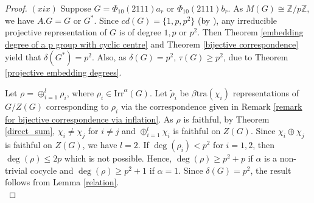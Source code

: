 \documentclass[a4paper,11pt]{amsart}
\numberwithin{equation}{section}
\numberwithin{equation}{subsection}
\newcommand{\Z}{\mathbb{Z}}
\newcommand{\tg}{\tau(G)}
\newcommand{\ti}{\tau_{irr}(G)}
\newcommand{\poonam}[1]{{\color{blue} #1}}
\begin{document}
\begin{proof}
$(xix)$ Suppose $G = \Phi_{10}(2111)a_r$ or $\Phi_{10}(2111)b_r$. %
As $M(G) \cong \Z/p\Z$, we have $A.G =G$ or $G^*$. Since $cd(G)=\{1,p,p^2\}$ (by \cite[Lemma 5.8]{Prajapati}), any irreducible projective representation of $G$ is of degree $1, p$ or $p^2$. Then Theorem \ref{embedding degree of a p group with cyclic centre} and Theorem \ref{bijective correspondence} yield that $\delta(G^*)= p^2$. Also, as $\delta(G)= p^2$, $\tau(G) \geq p^2$, due to Theorem \ref{projective embedding degrees}.  

Let $\rho = \oplus_{i=1}^l\rho_i$, where $\rho_i \in \mathrm{Irr}^\alpha(G)$. Let $\tilde\rho_i$ be $\beta\mathrm{tra}(\chi_i)$ representations of $G/Z(G)$ corresponding to $\rho_i$ via the correspondence given in Remark \ref{remark for bijective correspondence via inflation}. As $\rho$ is faithful, by Theorem \ref{direct_sum}, $\chi_i \neq \chi_j$ for $i \neq j$ and $\oplus_{i=1}^l\chi_i$ is faithful on $Z(G)$. Since $\chi_i \oplus \chi_j$ is faithful on $Z(G)$, we have $l=2$. If $\operatorname{deg}(\rho_i)<p^2$ for $i=1,2$, then $\operatorname{deg}(\rho) \leq 2p$ which is not possible.
Hence, $\operatorname{deg}(\rho) \geq p^2+p$ if $\alpha$ is a non-trivial cocycle and $\operatorname{deg}(\rho) \geq p^2+1$ if $\alpha=1$. Since $\delta(G)= p^2$, the result follows from Lemma \ref{relation}.  \\



\end{proof}
\end{document}
